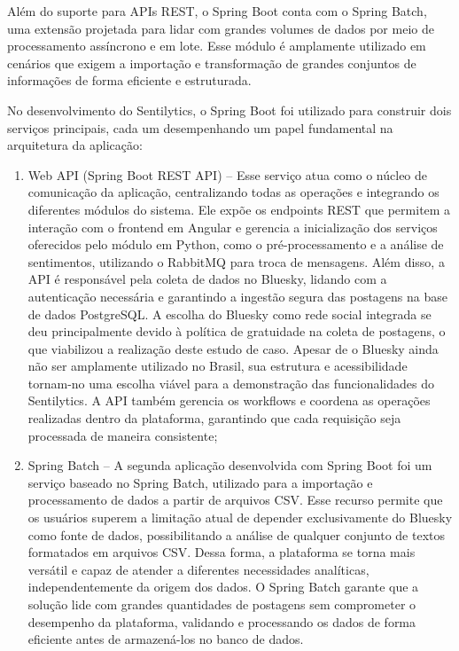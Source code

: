\documentclass[
	12pt,				%
	oneside,			%
	a4paper,			%
	english,			%
	french,				%
	spanish,			%
	brazil				%
	]{abntex2}
\begin{document}
Além do suporte para APIs REST, o Spring Boot conta com o Spring Batch,
uma extensão projetada para lidar com grandes volumes de dados por meio
de processamento assíncrono e em lote. Esse módulo é amplamente
utilizado em cenários que exigem a importação e transformação de grandes
conjuntos de informações de forma eficiente e estruturada.

No desenvolvimento do Sentilytics, o Spring Boot foi utilizado para
construir dois serviços principais, cada um desempenhando um papel
fundamental na arquitetura da aplicação:

\begin{enumerate}
\def\labelenumi{\arabic{enumi})}
\item
  Web API (Spring Boot REST API) -- Esse serviço atua como o núcleo de
  comunicação da aplicação, centralizando todas as operações e
  integrando os diferentes módulos do sistema. Ele expõe os endpoints
  REST que permitem a interação com o frontend em Angular e gerencia a
  inicialização dos serviços oferecidos pelo módulo em Python, como o
  pré-processamento e a análise de sentimentos, utilizando o RabbitMQ
  para troca de mensagens. Além disso, a API é responsável pela coleta
  de dados no Bluesky, lidando com a autenticação necessária e
  garantindo a ingestão segura das postagens na base de dados
  PostgreSQL. A escolha do Bluesky como rede social integrada se deu
  principalmente devido à política de gratuidade na coleta de postagens,
  o que viabilizou a realização deste estudo de caso. Apesar de o
  Bluesky ainda não ser amplamente utilizado no Brasil, sua estrutura e
  acessibilidade tornam-no uma escolha viável para a demonstração das
  funcionalidades do Sentilytics. A API também gerencia os workflows e
  coordena as operações realizadas dentro da plataforma, garantindo que
  cada requisição seja processada de maneira consistente;
\item
  Spring Batch -- A segunda aplicação desenvolvida com Spring Boot foi
  um serviço baseado no Spring Batch, utilizado para a importação e
  processamento de dados a partir de arquivos CSV. Esse recurso permite
  que os usuários superem a limitação atual de depender exclusivamente
  do Bluesky como fonte de dados, possibilitando a análise de qualquer
  conjunto de textos formatados em arquivos CSV. Dessa forma, a
  plataforma se torna mais versátil e capaz de atender a diferentes
  necessidades analíticas, independentemente da origem dos dados. O
  Spring Batch garante que a solução lide com grandes quantidades de
  postagens sem comprometer o desempenho da plataforma, validando e
  processando os dados de forma eficiente antes de armazená-los no banco
  de dados.
\end{enumerate}
\end{document}
